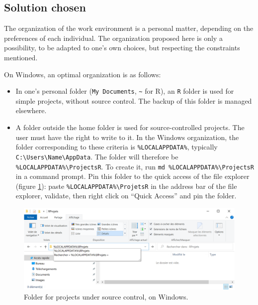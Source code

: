 \documentclass[
  12pt,
  american,
  a4paper,
  extrafontsizes,onecolumn,openright
  ]{memoir}
\providecommand{\tightlist}{%
  \setlength{\itemsep}{0pt}\setlength{\parskip}{0pt}}
\begin{document}
\hypertarget{sec:solution-dossiers}{%
\subsection{Solution chosen}\label{sec:solution-dossiers}}

The organization of the work environment is a personal matter, depending on the preferences of each individual.
The organization proposed here is only a possibility, to be adapted to one's own choices, but respecting the constraints mentioned.

On Windows, an optimal organization is as follows:

\begin{itemize}
\tightlist
\item
  In one's personal folder (\texttt{My\ Documents}, \texttt{\textasciitilde{}} for R), an \texttt{R} folder is used for simple projects, without source control.
  The backup of this folder is managed elsewhere.
\item
  A folder outside the home folder is used for source-controlled projects.
  The user must have the right to write to it.
  In the Windows organization, the folder corresponding to these criteria is \texttt{\%LOCALAPPDATA\%}, typically \texttt{C:\textbackslash{}Users\textbackslash{}Name\textbackslash{}AppData}.
  The folder will therefore be \texttt{\%LOCALAPPDATA\%\textbackslash{}ProjectsR}.
  To create it, run \texttt{md\ \%LOCALAPPDATA\%\textbackslash{}ProjectsR} in a command prompt.
  Pin this folder to the quick access of the file explorer (figure \ref{fig:R-ProjetsR}): paste \texttt{\%LOCALAPPDATA\%\textbackslash{}ProjetsR} in the address bar of the file explorer, validate, then right click on \enquote{Quick Access} and pin the folder.
\end{itemize}



\scriptsize

\begin{figure}

{\centering \includegraphics[width=1\linewidth]{images/R-ProjetsR} 

}

\caption{Folder for projects under source control, on Windows.}\label{fig:R-ProjetsR}
\end{figure}
\end{document}
